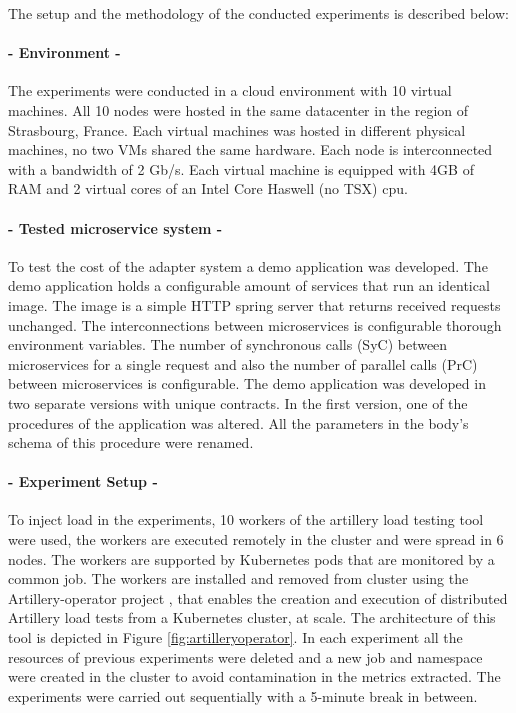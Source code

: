 The setup and the methodology of the conducted experiments is described below:

\paragraph{- Environment -}

The experiments were conducted in a cloud environment with 10 virtual machines.
All 10 nodes were hosted in the same datacenter in the region of Strasbourg, France.
Each virtual machines was hosted in different physical machines, no two VMs shared the same hardware.
Each node is interconnected with a bandwidth of 2 Gb/s.
Each virtual machine is equipped with 4GB of RAM and 2 virtual cores of an Intel Core Haswell (no TSX) cpu.

\paragraph{- Tested microservice system -}

To test the cost of the adapter system a demo application was developed.
The demo application holds a configurable amount of services that run an identical image.
The image is a simple HTTP spring server that returns received requests unchanged.
The interconnections between microservices is configurable thorough environment variables.
The number of synchronous calls (SyC) between microservices for a single request and also the number of parallel calls (PrC) between microservices is configurable.
The demo application was developed in two separate versions with unique contracts.
In the first version, one of the procedures of the application was altered.
All the parameters in the body's schema of this procedure were renamed.

\paragraph{- Experiment Setup -}

To inject load in the experiments, 10 workers of the artillery load testing tool were used,
the workers are executed remotely in the cluster and were spread in 6 nodes.
The workers are supported by Kubernetes pods that are monitored by a common job.
The workers are installed and removed from cluster using the Artillery-operator project \cite{artilleryoperator}, that enables
the creation and execution of distributed Artillery load tests from a Kubernetes cluster, at scale.
The architecture of this tool is depicted in Figure \ref{fig:artilleryoperator}.
In each experiment all the resources of previous experiments were deleted and a new job and namespace were created in the
cluster to avoid contamination in the metrics extracted.
The experiments were carried out sequentially with a 5-minute break in between.


